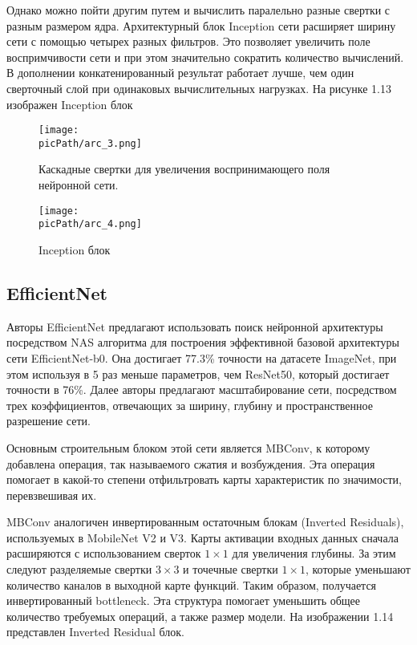 \documentclass[oneside,final,12pt]{extreport}
\newcommand{\picPath}{images}
\begin{document}
Однако можно пойти другим путем и вычислить паралельно разные свертки с разным размером ядра. Архитектурный блок Inception сети расширяет ширину сети с помощью четырех разных фильтров. Это позволяет увеличить поле воспримчивости сети и при этом значительно сократить количество вычислений. В дополнении конкатенированный результат работает лучше, чем один сверточный слой при одинаковых вычислительных нагрузках. На рисунке 1.13 изображен Inception блок
\begin{figure}[H]
\begin{center}
  \texttt{[image: \\picPath/arc\_3.png]}
  \caption{Каскадные свертки для увеличения воспринимающего поля нейронной сети.}
  \label{fig:arc_3}
  \end{center}
\end{figure}
\begin{figure}[H]
\begin{center}
  \texttt{[image: \\picPath/arc\_4.png]}
  \caption{Inception блок}
  \label{fig:arc_4}
  \end{center}
\end{figure}
\subsection{EfficientNet}
Авторы EfficientNet предлагают использовать поиск нейронной архитектуры посредством NAS алгоритма для построения эффективной базовой архитектуры сети EfficientNet-b0. Она достигает 77.3\% точности на датасете ImageNet, при этом используя в 5 раз меньше параметров, чем ResNet50, который достигает точности в 76\%. Далее авторы предлагают масштабирование сети, посредством трех коэффициентов, отвечающих за ширину, глубину и пространственное разрешение сети.

Основным строительным блоком этой сети является MBConv, к которому добавлена операция, так называемого сжатия и возбуждения. Эта операция помогает в какой-то степени отфильтровать карты характеристик по значимости, перевзвешивая их.

MBConv аналогичен инвертированным остаточным блокам (Inverted Residuals), используемых в MobileNet V2 и V3. Карты активации входных данных сначала расширяются с использованием сверток $1 \times 1$ для увеличения глубины. За этим следуют разделяемые свертки $3 \times 3$ и точечные свертки $1 \times 1$, которые уменьшают количество каналов в выходной карте функций. Таким образом, получается инвертированный bottleneck. Эта структура помогает уменьшить общее количество требуемых операций, а также размер модели. На изображении 1.14 представлен Inverted Residual блок.
\end{document}
